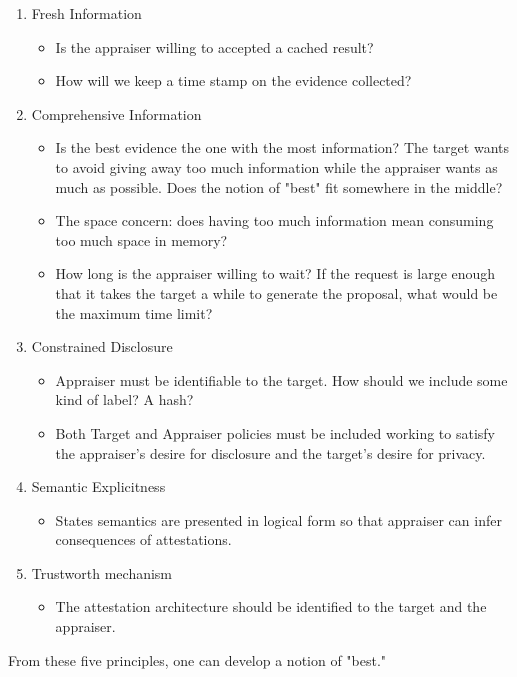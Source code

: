 \documentclass[10pt]{report}
\begin{document}
\begin{enumerate}
  \item Fresh Information
	\begin{itemize}
	\item Is the appraiser willing to accepted a cached result?
	\item How will we keep a time stamp on the evidence collected?
	\end{itemize}
  \item Comprehensive Information
	\begin{itemize}
	\item Is the best evidence the one with the most information? 
		  The target wants to avoid giving away too much information
		  while the appraiser wants as much as possible. Does the
          notion of "best" fit somewhere in the middle?
	\item The space concern: does having too much information mean 
          consuming too much space in memory?
	\item How long is the appraiser willing to wait? If the request
		  is large enough that it takes the target a while to generate
          the proposal, what would be the maximum time limit?
	\end{itemize}
  \item Constrained Disclosure
	\begin{itemize}
	\item Appraiser must be identifiable to the target. How should 
		  we include some kind of label? A hash? 
	\item Both Target and Appraiser policies must be included working
		  to satisfy the appraiser's desire for disclosure and the
		  target's desire for privacy. 
	\end{itemize}
  \item Semantic Explicitness
	\begin{itemize}
	\item States semantics are presented in logical form so that appraiser
          can infer consequences of attestations. 
	\end{itemize}
  \item Trustworth mechanism
	\begin{itemize}
	\item The attestation architecture should be identified to the target
		  and the appraiser. 
	\end{itemize}
\end{enumerate}

From these five principles, one can develop a notion of "best."
\end{document}
